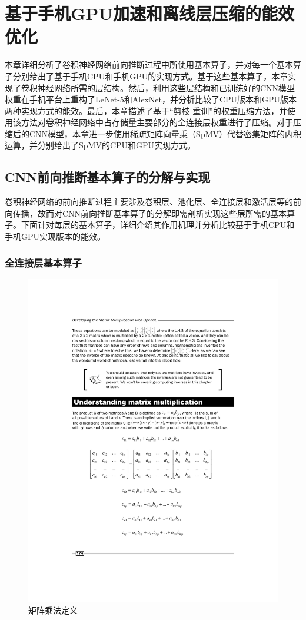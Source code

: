 \chapter{基于手机GPU加速和离线层压缩的能效优化}


本章详细分析了卷积神经网络前向推断过程中所使用基本算子，并对每一个基本算子分别给出了基于手机CPU和手机GPU的实现方式。基于这些基本算子，本章实现了卷积神经网络所需的层结构。然后，利用这些层结构和已训练好的CNN模型权重在手机平台上重构了LeNet-5和AlexNet，并分析比较了CPU版本和GPU版本两种实现方式的能效。最后，本章描述了基于“剪枝-重训”的权重压缩方法，并使用该方法对卷积神经网络中占存储量主要部分的全连接层权重进行了压缩。对于压缩后的CNN模型，本章进一步使用稀疏矩阵向量乘（SpMV）代替密集矩阵的内积运算，并分别给出了SpMV的CPU和GPU实现方式。

\section{CNN前向推断基本算子的分解与实现}
\label{chapter:chapter3-1}
卷积神经网络的前向推断过程主要涉及卷积层、池化层、全连接层和激活层等的前向传播，故而对CNN前向推断基本算子的分解即需剖析实现这些层所需的基本算子。下面针对每层的基本算子，详细介绍其作用机理并分析比较基于手机CPU和手机GPU实现版本的能效。

\subsection{全连接层基本算子}

\begin{figure}[htbp]
    \begin{center}
    \includegraphics[height=0.5\textwidth]{figures/mat.pdf}
    \end{center}
    \caption{矩阵乘法定义}\label{figure:figure8}
\end{figure}

